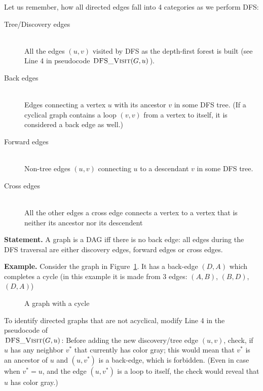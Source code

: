 \documentclass[a4paper,12pt]{article}
\begin{document}
Let us remember, how all directed edges fall into 4 categories as we 
perform DFS: 
\begin{description}
\item[Tree/Discovery edges] \hfill \\
All the edges $(u,v)$ visited by DFS as the depth-first forest is built (see Line 4 
in pseudocode $\text{\sc DFS\textunderscore{}Visit}(G,u)$). 
\item[Back edges] \hfill \\ 
Edges connecting a vertex $u$ with its ancestor $v$ in some DFS tree.
(If a cyclical graph contains a loop $(v,v)$ from a vertex to itself, 
it is considered a back edge as well.)
\item[Forward edges] \hfill\\
Non-tree edges $(u,v)$ connecting $u$ to a descendant $v$ in some DFS tree. 
\item[Cross edges] \hfill\\
All the other edges \textendash{} a cross edge connects a vertex to a vertex 
that is neither its ancestor nor its descendent
\end{description}




{\bf Statement.} A graph is a DAG iff there is no 
back edge: all edges during the DFS traversal are either
discovery edges, forward edges or cross edges. 

{\bf Example.} Consider the graph in Figure~\ref{fig:cyclical-graph}. 
It has a back-edge $(D,A)$ which completes a cycle 
(in this example it is made from $3$ edges: $(A,B)$, $(B,D)$, $(D,A)$)

\begin{figure}[!htb]
\caption{\label{fig:cyclical-graph} A graph with a cycle}
\end{figure}


To identify directed graphs that are not acyclical, 
modify Line 4 in the pseudocode of\\
$\text{\sc DFS\textunderscore{}Visit}(G,u)$: 
Before adding the new discovery/tree edge $(u,v)$, check, 
if $u$ has any neighbor $v^{\ast}$ that currently has color {\sc gray}; 
this would mean that $v^{\ast}$ is an ancestor of $u$ and 
$(u,v^{\ast})$ is a back-edge, which is forbidden.
(Even in case when $v^{\ast} = u$, and the edge $(u,v^{\ast})$ is 
a loop to itself, the check would reveal that $u$ has color {\sc gray}.)
\end{document}
